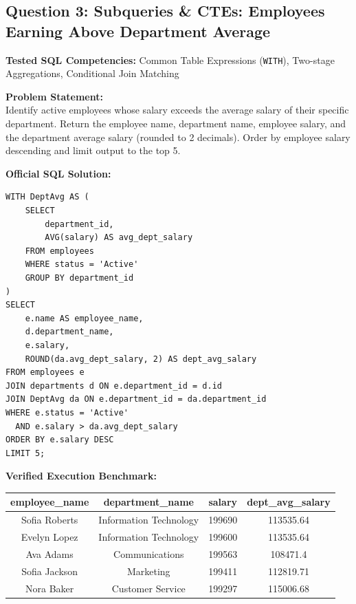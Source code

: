 \documentclass[11pt,a4paper]{article}
\begin{document}
\subsection*{Question 3: Subqueries & CTEs: Employees Earning Above Department Average}

\noindent\textbf{Tested SQL Competencies:} Common Table Expressions (\texttt{WITH}), Two-stage Aggregations, Conditional Join Matching

\vspace{0.15cm}
\noindent\textbf{Problem Statement:} \\
Identify active employees whose salary exceeds the average salary of their specific department. Return the employee name, department name, employee salary, and the department average salary (rounded to 2 decimals). Order by employee salary descending and limit output to the top 5.

\vspace{0.25cm}
\noindent\textbf{Official SQL Solution:}
\begin{verbatim}
WITH DeptAvg AS (
    SELECT 
        department_id,
        AVG(salary) AS avg_dept_salary
    FROM employees
    WHERE status = 'Active'
    GROUP BY department_id
)
SELECT 
    e.name AS employee_name,
    d.department_name,
    e.salary,
    ROUND(da.avg_dept_salary, 2) AS dept_avg_salary
FROM employees e
JOIN departments d ON e.department_id = d.id
JOIN DeptAvg da ON e.department_id = da.department_id
WHERE e.status = 'Active' 
  AND e.salary > da.avg_dept_salary
ORDER BY e.salary DESC
LIMIT 5;
\end{verbatim}

\vspace{0.15cm}
\noindent\textbf{Verified Execution Benchmark:}
\begin{center}
\small
\begin{tabular}{cccc}
\toprule
\textbf{employee\_name} & \textbf{department\_name} & \textbf{salary} & \textbf{dept\_avg\_salary} \\
\midrule
Sofia Roberts & Information Technology & 199690 & 113535.64 \\
Evelyn Lopez & Information Technology & 199600 & 113535.64 \\
Ava Adams & Communications & 199563 & 108471.4 \\
Sofia Jackson & Marketing & 199411 & 112819.71 \\
Nora Baker & Customer Service & 199297 & 115006.68 \\
\bottomrule
\end{tabular}
\end{center}
\end{document}

